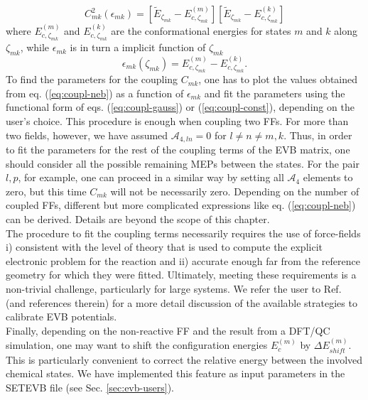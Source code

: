 \begin{equation}\label{eq:coupl-neb}
C^{2}_{mk}(\epsilon_{mk})=\left[ \tilde{E}_{\zeta_{mk}}-E^{(m)}_{c,\zeta_{mk}} \right] \left[ \tilde{E}_{\zeta_{mk}}-E^{(k)}_{c,\zeta_{mk}} \right]
\end{equation}
where $E^{(m)}_{c,\zeta_{mk}}$ and $E^{(k)}_{c,\zeta_{mk}}$ are the conformational energies for states $m$ and $k$ along $\zeta_{mk}$, while $\epsilon_{mk}$ is in turn a implicit function of $\zeta_{mk}$
\begin{equation}\label{eq:coupl-EG}
\epsilon_{mk}(\zeta_{mk})=E^{(m)}_{c,\zeta_{mk}}-E^{(k)}_{c,\zeta_{mk}}.
\end{equation}
To find the parameters for the coupling $C_{mk}$, one has to plot the values obtained from eq. (\ref{eq:coupl-neb}) as a function of $\epsilon_{mk}$ and fit the parameters using the functional form of eqs. (\ref{eq:coupl-gauss}) or (\ref{eq:coupl-const}), depending on the user's choice. This procedure is enough when coupling two FFs. For more than two fields, however, we have assumed $\mathcal{A}_{4,ln}=0$ for $l\ne n \ne m,k$. Thus, in order to fit the parameters for the rest of the coupling terms of the EVB matrix, one should consider all the possible remaining MEPs between the states. For the pair $l,p$, for example, one can proceed in a similar way by setting all $\mathcal{A}_{4}$ elements to zero, but this time $C_{mk}$ will not be necessarily zero. Depending on the number of coupled FFs, different but more complicated expressions like eq. (\ref{eq:coupl-neb}) can be derived. Details are beyond the scope of this chapter.\\
The procedure to fit the coupling terms necessarily requires the use of force-fields i) consistent with the level of theory that is used to compute the explicit electronic problem for the reaction and ii) accurate enough far from the reference geometry for which they were fitted. Ultimately, meeting these requirements is a non-trivial challenge, particularly for large systems. We refer the user to Ref. \cite{scivetti-evb} (and references therein) for a more detail discussion of the available strategies to calibrate EVB potentials.\\
Finally, depending on the non-reactive FF and the result from a DFT/QC simulation, one may want to shift the configuration energies $E^{(m)}_{c}$ by $\Delta E^{(m)}_{shift}$. This is particularly convenient to correct the relative energy between the involved chemical states. We have implemented this feature as input parameters in the SETEVB file (see Sec. \ref{sec:evb-users}).

